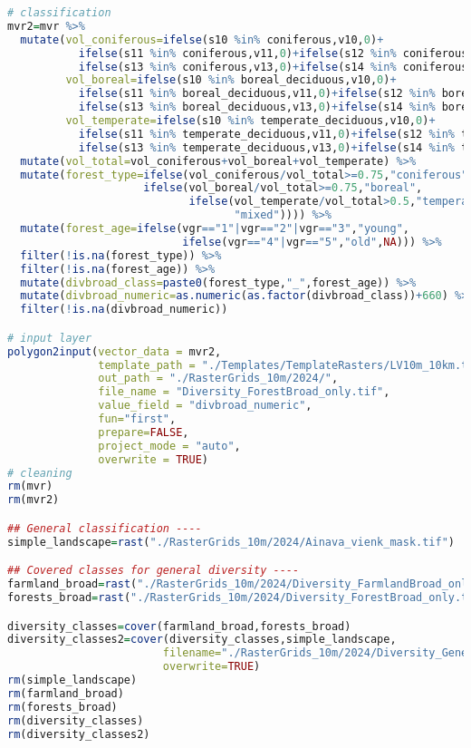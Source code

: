 \documentclass[
]{book}
\begin{document}
\begin{lstlisting}[language=R]
# classification
mvr2=mvr %>% 
  mutate(vol_coniferous=ifelse(s10 %in% coniferous,v10,0)+
           ifelse(s11 %in% coniferous,v11,0)+ifelse(s12 %in% coniferous,v12,0)+
           ifelse(s13 %in% coniferous,v13,0)+ifelse(s14 %in% coniferous,v14,0),
         vol_boreal=ifelse(s10 %in% boreal_deciduous,v10,0)+
           ifelse(s11 %in% boreal_deciduous,v11,0)+ifelse(s12 %in% boreal_deciduous,v12,0)+
           ifelse(s13 %in% boreal_deciduous,v13,0)+ifelse(s14 %in% boreal_deciduous,v14,0),
         vol_temperate=ifelse(s10 %in% temperate_deciduous,v10,0)+
           ifelse(s11 %in% temperate_deciduous,v11,0)+ifelse(s12 %in% temperate_deciduous,v12,0)+
           ifelse(s13 %in% temperate_deciduous,v13,0)+ifelse(s14 %in% temperate_deciduous,v14,0)) %>% 
  mutate(vol_total=vol_coniferous+vol_boreal+vol_temperate) %>% 
  mutate(forest_type=ifelse(vol_coniferous/vol_total>=0.75,"coniferous",
                     ifelse(vol_boreal/vol_total>=0.75,"boreal",
                            ifelse(vol_temperate/vol_total>0.5,"temperate",
                                   "mixed")))) %>% 
  mutate(forest_age=ifelse(vgr=="1"|vgr=="2"|vgr=="3","young",
                           ifelse(vgr=="4"|vgr=="5","old",NA))) %>% 
  filter(!is.na(forest_type)) %>% 
  filter(!is.na(forest_age)) %>% 
  mutate(divbroad_class=paste0(forest_type,"_",forest_age)) %>% 
  mutate(divbroad_numeric=as.numeric(as.factor(divbroad_class))+660) %>% 
  filter(!is.na(divbroad_numeric))

# input layer
polygon2input(vector_data = mvr2,
              template_path = "./Templates/TemplateRasters/LV10m_10km.tif",
              out_path = "./RasterGrids_10m/2024/",
              file_name = "Diversity_ForestBroad_only.tif",
              value_field = "divbroad_numeric",
              fun="first",
              prepare=FALSE,
              project_mode = "auto",
              overwrite = TRUE)
# cleaning
rm(mvr)
rm(mvr2)

## General classification ----
simple_landscape=rast("./RasterGrids_10m/2024/Ainava_vienk_mask.tif")

## Covered classes for general diversity ----
farmland_broad=rast("./RasterGrids_10m/2024/Diversity_FarmlandBroad_only.tif")
forests_broad=rast("./RasterGrids_10m/2024/Diversity_ForestBroad_only.tif")

diversity_classes=cover(farmland_broad,forests_broad)
diversity_classes2=cover(diversity_classes,simple_landscape,
                        filename="./RasterGrids_10m/2024/Diversity_GeneralLandscapeBroad.tif",
                        overwrite=TRUE)
rm(simple_landscape)
rm(farmland_broad)
rm(forests_broad)
rm(diversity_classes)
rm(diversity_classes2)


\end{lstlisting}
\end{document}
